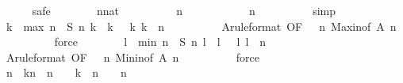 \begin{isabellebody}
\ \ \ \ \isamarkupfalse%
\ safe\isanewline
\ \ \ \ \ \ \isamarkupfalse%
\ n{\isacharcolon}{\isacharcolon}nat\isanewline
\ \ \ \ \ \ \isamarkupfalse%
\ {\isachardoublequoteopen}{}\ {\isacharless}\ n{\isachardoublequoteclose}\isanewline
\ \ \ \ \ \ \isamarkupfalse%
\ \isamarkupfalse%
\ {\isachardoublequoteopen}{}\ {\isasymle}\ n{\isachardoublequoteclose}\isanewline
\ \ \ \ \ \ \ \ \isamarkupfalse%
\ simp\isanewline
\ \ \ \ \ \ \isamarkupfalse%
\ k\ \ {\isachardoublequoteopen}{\isacharquery}max\ n\ {\isacharequal}\ {\isacharquery}S\ n\ k\ {\isacharslash}\ k{\isachardoublequoteclose}\ {\isachardoublequoteopen}{}\ {\isasymle}\ k{\isachardoublequoteclose}\ {\isachardoublequoteopen}k\ {\isasymle}\ n{\isachardoublequoteclose}\isanewline
\ \ \ \ \ \ \ \ \isamarkupfalse%
\ A{\isacharbrackleft}rule{\isacharunderscore}format{\isacharcomma}\ OF\ {\isacharbackquoteopen}{}\ {\isasymle}\ n{\isacharbackquoteclose}{\isacharbrackright}\ Max{\isacharunderscore}in{\isacharbrackleft}of\ {\isachardoublequoteopen}{\isacharquery}A\ n{\isachardoublequoteclose}{\isacharbrackright}\isanewline
\ \ \ \ \ \ \ \ \isamarkupfalse%
\ force\isanewline
\ \ \ \ \ \ \isamarkupfalse%
\ l\ \ {\isachardoublequoteopen}{\isacharquery}min\ n\ {\isacharequal}\ {\isacharquery}S\ n\ l\ {\isacharslash}\ l{\isachardoublequoteclose}\ {\isachardoublequoteopen}{}\ {\isasymle}\ l{\isachardoublequoteclose}\ {\isachardoublequoteopen}l\ {\isasymle}\ n{\isachardoublequoteclose}\isanewline
\ \ \ \ \ \ \ \ \isamarkupfalse%
\ A{\isacharbrackleft}rule{\isacharunderscore}format{\isacharcomma}\ OF\ {\isacharbackquoteopen}{}\ {\isasymle}\ n{\isacharbackquoteclose}{\isacharbrackright}\ Min{\isacharunderscore}in{\isacharbrackleft}of\ {\isachardoublequoteopen}{\isacharquery}A\ n{\isachardoublequoteclose}{\isacharbrackright}\isanewline
\ \ \ \ \ \ \ \ \isamarkupfalse%
\ force\isanewline
\isanewline
\ \ \ \ \ \ \isamarkupfalse%
\ {\isachardoublequoteopen}{\isacharbrackleft}n\ {\isacharminus}\ k{\isachardot}{\isachardot}{\isacharless}n{\isacharbrackright}\ {\isacharequal}\ {\isacharbrackleft}n\ {\isacharminus}\ {}\ {\isacharminus}\ {\isacharparenleft}k\ {\isacharminus}\ {}{\isacharparenright}{\isachardot}{\isachardot}{\isacharless}n\ {\isacharminus}\ {}{\isacharbrackright}\ {\isacharat}\ {\isacharbrackleft}n\ {\isacharminus}\ {}{\isacharbrackright}{\isachardoublequoteclose}\isanewline

\end{isabellebody}
